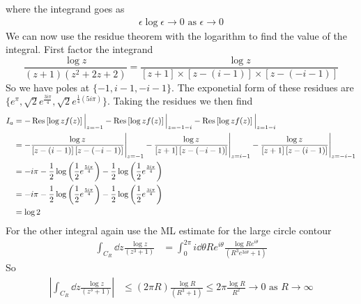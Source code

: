 \documentclass[a4paper,12pt]{article}
\begin{document}
where the integrand goes as
\begin{equation}
	\begin{aligned}
 \epsilon\log \epsilon \to 0 \text{ as }\epsilon\to 0
	\end{aligned}
\end{equation}
We can now use the residue theorem with the logarithm to find the value of the integral. First factor the integrand
\begin{equation}
\frac{\log z}{(z+1)(z^2+2z+2)}= \frac{\log z}{[z+1]\times \left[z-(i-1)\right]\times \left[z-(-i-1)\right]}
\end{equation}
So we have poles at $\{-1,i-1,-i-1\}$. The exponetial form of these residues are  $\{e^{\pi},\sqrt{2} e^{\frac{3 i \pi }{4}},\sqrt{2} e^{\frac{1}{4} (5 i \pi )}\}$. Taking the residues we then find
\begin{equation}
	\begin{aligned}
	I_a&=-\Res\left[\log z f(z)\right]\Big|_{z=-1}-\Res\left[\log zf(z)\right]\Big|_{z=-1-i}-\Res\left[\log zf(z)\right]\Big|_{z=1-i}\\
	&=-\frac{\log z}{\left[z-(i-1)\right] \left[z-(-i-1)\right]}\Bigg|_{z=-1}-\frac{\log z}{\left[z+1\right] \left[z-(-i-1)\right]}\Bigg|_{z=i-1}-\frac{\log z}{\left[z+1\right] \left[z-(i-1)\right]}\Bigg|_{z=-i-1}\\
	&=-i \pi -\frac{1}{2} \log \left(\frac{1}{2}e^{\frac{5 i \pi }{4}}\right)-\frac{1}{2} \log \left(\frac{1}{2} e^{\frac{3 i \pi }{4}}\right)\\
	&=-i \pi -\frac{1}{2} \log \left(\frac{1}{2}e^{\frac{5 i \pi }{4}}\right)-\frac{1}{2} \log \left(\frac{1}{2} e^{\frac{3 i \pi }{4}}\right)\\
	&=\log 2	\end{aligned}
\end{equation}
For the other integral again use the ML estimate for the large circle contour
\begin{equation}
	\begin{aligned}
		\int_{C_R} \dd z \frac{\log z}{(z^3+1)}&=\int_{0}^{2\pi} i\dd \theta R e^{i\theta} \frac{\log Re^{i\theta}}{(R^3e^{3i\theta}+1)}
	\end{aligned}
\end{equation}
So
\begin{equation}
	\begin{aligned}
		\left|\int_{C_R} \dd z \frac{\log z}{(z^3+1)}\right|&\leq(2\pi R)
		\frac{\log R}{(R^3+1)}\leq2\pi \frac{\log R}{R^2}\to 0 \text{ as } R\to\infty
	\end{aligned}
\end{equation}
\end{document}
